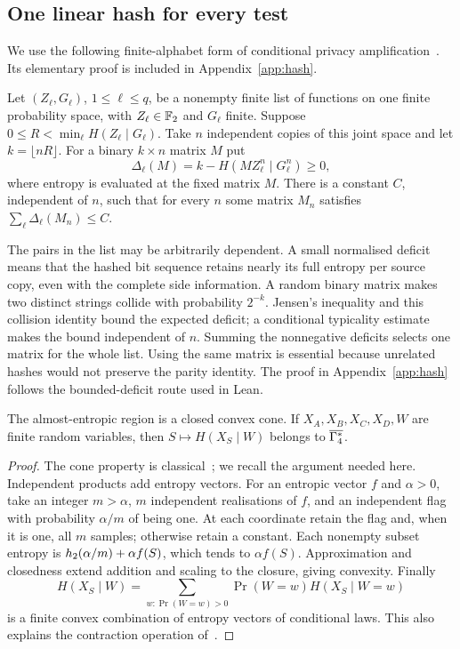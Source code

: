 \subsection{One linear hash for every test}
We use the following finite-alphabet form of conditional privacy
amplification~\cite{BBCM,Csiszar96,RW}. Its elementary proof is included
in Appendix~\ref{app:hash}.

\begin{samepage}
\begin{lemma}\label{lem:hash}
Let $(Z_\ell,G_\ell)$, $1\le\ell\le q$, be a nonempty finite list of
functions on one finite
probability space, with $Z_\ell\in\mathbb F_2$ and $G_\ell$ finite. Suppose
$0\le R<\min_\ell H(Z_\ell\mid G_\ell)$.
Take $n$ independent copies of this joint space and let $k=\lfloor nR\rfloor$.
For a binary $k\times n$ matrix $M$ put
\[
 \Delta_\ell(M)=k-H(MZ_\ell^n\mid G_\ell^n)\ge0,
\]
where entropy is evaluated at the fixed matrix $M$.
There is a constant $C$, independent of $n$, such that for every $n$
some matrix $M_n$ satisfies $\sum_\ell\Delta_\ell(M_n)\le C$.
\end{lemma}
\end{samepage}

The pairs in the list may be arbitrarily dependent. A small normalised
deficit means that the hashed bit sequence retains nearly its full
entropy per source copy, even with the complete side information.
A random binary matrix makes two distinct strings collide with probability
$2^{-k}$. Jensen's inequality and this collision identity bound the
expected deficit; a conditional typicality estimate makes the bound
independent of $n$. Summing the nonnegative deficits selects one matrix
for the whole list. Using the same matrix is essential because unrelated
hashes would not preserve the parity identity. The proof in
Appendix~\ref{app:hash} follows the bounded-deficit route used in Lean.

\begin{lemma}\label{lem:cone}
The almost-entropic region is a closed convex cone. If
$X_A,X_B,X_C,X_D,W$ are finite random variables, then
$S\mapsto H(X_S\mid W)$ belongs to $\overline{\Gamma_4^{*}}$.
\end{lemma}
\begin{proof}
The cone property is classical~\cite[Theorem~1]{ZY}; we recall the
argument needed here. Independent products add entropy vectors.
For an entropic vector $f$ and $\alpha>0$, take an integer $m>\alpha$,
$m$ independent realisations of $f$, and an independent flag with
probability $\alpha/m$ of being one. At each coordinate retain the flag
and, when it is one, all $m$ samples; otherwise retain a constant.
Each nonempty subset entropy is $h_2(\alpha/m)+\alpha f(S)$, which tends
to $\alpha f(S)$. Approximation and closedness extend addition and scaling
to the closure, giving convexity.
Finally
\[
 H(X_S\mid W)=\sum_{w:\Pr(W=w)>0}\Pr(W=w)H(X_S\mid W=w)
\]
is a finite convex combination of entropy vectors of conditional laws.
This also explains the contraction operation of~\cite[Lemma~1]{MC}.
\end{proof}

